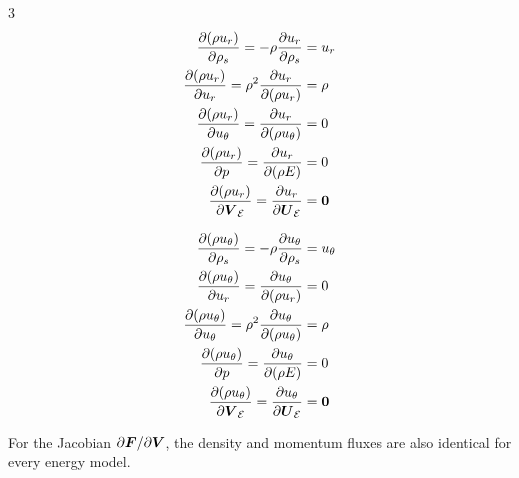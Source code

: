 \documentclass[10pt]{article}
\begin{document}
\begin{flushleft}
\begin{multicols}{3}
    \begin{align*}
        \frac{\partial (\rho u_r)}{\partial \rho_s} = -\rho \frac{\partial u_r}{\partial \rho_s} &= u_r \\
        \frac{\partial (\rho u_r)}{\partial u_r} = \rho^2 \frac{\partial u_r}{\partial (\rho u_r)} &= \rho \\
        \frac{\partial (\rho u_r)}{\partial u_\theta} = \frac{\partial u_r}{\partial (\rho u_\theta)} &= 0 \\
        \frac{\partial (\rho u_r)}{\partial p} = \frac{\partial u_r}{\partial (\rho E)} &= 0 \\
        \frac{\partial (\rho u_r)}{\partial \boldsymbol{V}_{\mathcal{E}}} = \frac{\partial u_r}{\partial \boldsymbol{U}_{\mathcal{E}}} &= \boldsymbol{0}
    \end{align*}

    \begin{align*}
        \frac{\partial (\rho u_\theta)}{\partial \rho_s} = -\rho \frac{\partial u_\theta}{\partial \rho_s} &= u_\theta \\
        \frac{\partial (\rho u_\theta)}{\partial u_r} = \frac{\partial u_\theta}{\partial (\rho u_r)} &= 0 \\
        \frac{\partial (\rho u_\theta)}{\partial u_\theta} = \rho^2 \frac{\partial u_\theta}{\partial (\rho u_\theta)} &= \rho \\
        \frac{\partial (\rho u_\theta)}{\partial p} = \frac{\partial u_\theta}{\partial (\rho E)} &= 0 \\
        \frac{\partial (\rho u_\theta)}{\partial \boldsymbol{V}_{\mathcal{E}}} = \frac{\partial u_\theta}{\partial \boldsymbol{U}_{\mathcal{E}}} &= \boldsymbol{0}
    \end{align*}
\end{multicols}

For the Jacobian $\partial \boldsymbol{F} / \partial \boldsymbol{V}$, the density and momentum fluxes are also identical for every energy model.


\end{flushleft}
\end{document}
